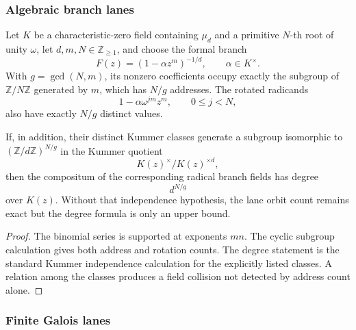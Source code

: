 \subsubsection{Algebraic branch lanes}

\begin{proposition}
\label{prop:block15-algebraic-specialization}
Let \(K\) be a characteristic-zero field containing \(\mu_d\) and a
primitive \(N\)-th root of unity \(\omega\), let
\(d,m,N\in\mathbb Z_{\ge1}\), and choose
the formal branch
\[
 F(z)=(1-\alpha z^m)^{-1/d},
 \qquad \alpha\in K^\times.
\]
With \(g=\gcd(N,m)\), its nonzero coefficients occupy exactly the subgroup of
\(\mathbb Z/N\mathbb Z\) generated by \(m\), which has \(N/g\) addresses.
The rotated radicands
\[
 1-\alpha\omega^{jm}z^m,
 \qquad 0\le j<N,
\]
also have exactly \(N/g\) distinct values.

If, in addition, their distinct Kummer classes generate a subgroup isomorphic
to \((\mathbb Z/d\mathbb Z)^{N/g}\) in the Kummer quotient
\[
 K(z)^\times/K(z)^{\times d},
\]
then the compositum of the corresponding radical branch fields has degree
\[
 d^{N/g}
\]
over \(K(z)\).  Without that independence hypothesis, the lane orbit count
remains exact but the degree formula is only an upper bound.
\end{proposition}

\begin{proof}
The binomial series is supported at exponents \(mn\).  The cyclic subgroup
calculation gives both address and rotation counts.  The degree statement is
the standard Kummer independence calculation for the explicitly listed
classes.  A relation among the classes produces a field collision not detected
by address count alone.
\end{proof}

\subsubsection{Finite Galois lanes}

